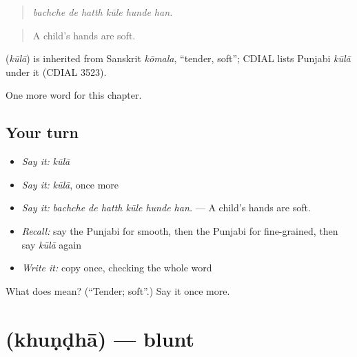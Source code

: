 \begin{quote}
     
\end{quote}

\begin{quote}
\emph{bachche de hatth kūle hunde han.}
\end{quote}

\begin{quote}
A child's hands are soft.
\end{quote}

\begin{cousinweb}
\textbf{} (\emph{kūlā}) is inherited from Sanskrit \emph{kōmala}, \textquotedblleft{}tender, soft\textquotedblright{}; CDIAL lists Punjabi \emph{kūlā} under it (CDIAL 3523).
\end{cousinweb}

\begin{grammarlens}[title={What you've built}]
One more word for this chapter.
\end{grammarlens}

\subsection*{Your turn}
\begin{itemize}
\raggedright
  \item \emph{Say it:} \emph{kūlā}
  \item \emph{Say it:} \emph{kūlā}, once more
  \item \emph{Say it:} \emph{bachche de hatth kūle hunde han.} — A child's hands are soft.
  \item \emph{Recall:} say the Punjabi for smooth, then the Punjabi for fine-grained, then say \emph{kūlā} again
  \item \emph{Write it:} copy \textbf{} once, checking the whole word
\end{itemize}

\begin{tcolorbox}[breakable,colback=teal!4,colframe=teal!35!black,title={Before you move on}]
What does  mean? (\textquotedblleft{}Tender; soft\textquotedblright{}.) Say it once more.
\end{tcolorbox}
\section[\texorpdfstring{\pa{ਖੁੰਢਾ} (khuṇḍhā)}{ਖੁੰਢਾ (khuṇḍhā)}]{ (khuṇḍhā) — blunt}

